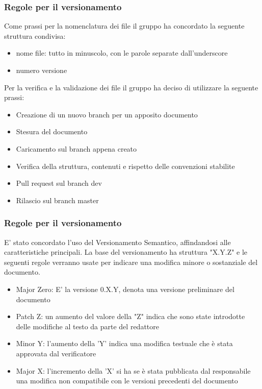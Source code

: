\documentclass[12pt]{article}
\begin{document}
\subsubsection{Regole per il versionamento}
Come prassi per la nomenclatura dei file il gruppo ha concordato la seguente struttura condivisa:
\begin{itemize}
    \item nome file: tutto in minuscolo, con le parole separate dall'underscore
    \item numero versione
\end{itemize}

Per la verifica e la validazione dei file il gruppo ha deciso di utilizzare la seguente prassi:
\begin{itemize}
    \item Creazione di un nuovo branch per un apposito documento
    \item Stesura del documento
    \item Caricamento sul branch appena creato
    \item Verifica della struttura, contenuti e rispetto delle convenzioni stabilite
    \item Pull request sul branch dev
    \item Rilascio sul branch master
\end{itemize}

\subsubsection{Regole per il versionamento}
\label{ver}
E' stato concordato l'uso del Versionamento Semantico, affindandosi alle caratteristiche principali.
La base del versionamento ha struttura "X.Y.Z" e le seguenti regole verranno usate per indicare una modifica minore o sostanziale del documento.
\begin{itemize}
    \item Major Zero: E' la versione 0.X.Y, denota una versione preliminare del documento
    \item Patch Z: un aumento del valore della "Z" indica che sono state introdotte delle modifiche al testo da parte del redattore
    \item Minor Y: l'aumento della 'Y' indica una modifica testuale che è stata approvata dal verificatore
    \item Major X: l'incremento della 'X' si ha se è stata pubblicata dal responsabile una modifica non compatibile con le versioni precedenti del documento
\end{itemize}
\end{document}
